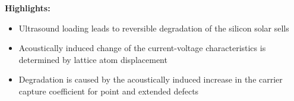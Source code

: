 \documentclass[preprint]{elsarticle}
\begin{document}
\textbf{Highlights:}

\begin{itemize}
  \item Ultrasound loading leads to reversible degradation of the silicon solar sells
  \item Acoustically induced change of the current-voltage characteristics is determined by lattice atom
displacement 
  \item Degradation is caused by the acoustically induced increase in the carrier capture coefficient for point and extended defects
\end{itemize}
\end{document}
